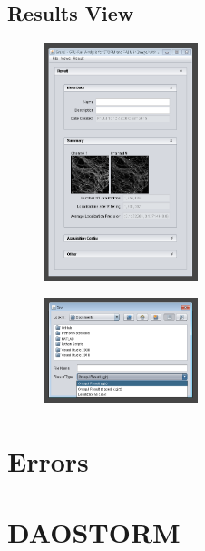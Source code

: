\documentclass[aspectratio=169]{beamer}
\begin{document}
\subsection{Results View}
\begin{frame}
 
 \begin{figure}[h!]
    \centering	\includegraphics[width=0.4\textwidth]{./images/graspj_results1.png} 
    \caption{}
    \label{fig:results1}
    \end{figure} 
 
\end{frame}

\begin{frame}
 
 \begin{figure}[h!]
    \centering	\includegraphics[width=0.4\textwidth]{./images/graspj_results2.png} 
    \caption{}
    \label{fig:results2}
    \end{figure} 
 
\end{frame}

\section{Errors}





\section{DAOSTORM}
\end{document}
